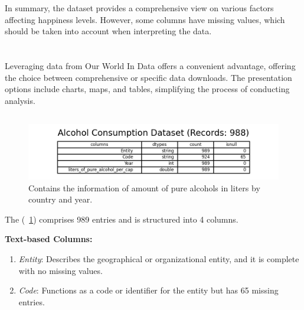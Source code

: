                 In summary, the dataset provides a comprehensive view on various factors affecting happiness levels. However, some columns have missing values, which should be taken into account when interpreting the data.


    \section{\dsAlcohol}

        \subsection{\duCollectInitialData}
            Leveraging data from Our World In Data offers a convenient advantage, offering the choice between comprehensive or specific data downloads. The presentation options include charts, maps, and tables, simplifying the process of conducting analysis.

        \subsection{\duDescribeTheData}
            \begin{figure}[H]
                \centering
                \includegraphics[scale=1.3]{images/du_alcohol_consumption_dataset}
                \caption{Contains the information of amount of pure alcohols in liters by country and year.}
                \label{fig:du-alcohol-datasets}
            \end{figure}

            The \textit{\dsAlcohol} (\figurename~\ref{fig:du-alcohol-datasets}) comprises 989 entries and is structured into 4 columns.

            \textbf{Text-based Columns:}
            \begin{enumerate}
                \item \textit{Entity}: Describes the geographical or organizational entity, and it is complete with no missing values.
                \item \textit{Code}: Functions as a code or identifier for the entity but has 65 missing entries.
            \end{enumerate}

